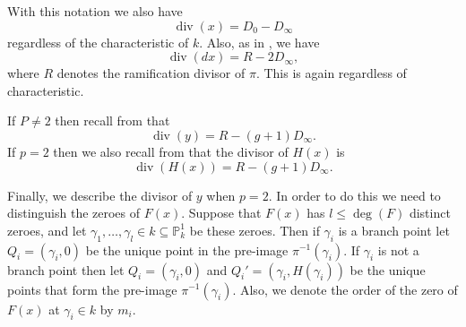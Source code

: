 \documentclass[draft, 11pt]{article} %
\theoremstyle{plain}
\theoremstyle{remark}
\DeclareMathOperator{\di}{div}
\begin{document}
With this notation we also have
\begin{equation}\label{divxp=2}
\di (x)  = D_0 - D_\infty
\end{equation}
regardless of the characteristic of $k$.
Also, as in \cite[\S 6]{faithfulaction}, we have
\begin{equation}\label{differentialdivisor}
\di(dx) = R - 2D_\infty,
\end{equation}
where $R$ denotes the ramification divisor of $\pi$.
This is again regardless of characteristic.

If $P \neq 2$ then recall from \cite[\S 6]{faithfulaction} that
\begin{equation}\label{pnot2divisors}
\di(y)  = R - (g+1)D_\infty.
\end{equation}
If $p=2$ then we also recall from \cite[\S 6]{faithfulaction} that the divisor of $H(x)$ is
\begin{equation}\label{divisorofH}
\di (H(x))  = R - (g+1)D_\infty. 
\end{equation}

Finally, we describe the divisor of $y$ when $p=2$.
In order to do this we need to distinguish the zeroes of $F(x)$.
Suppose that $F(x)$ has $l \leq \deg(F)$ distinct zeroes, and let $\gamma_1, \ldots, \gamma_l \in k \subseteq \mathbb P_k^1$ be these zeroes.
Then if $\gamma_i$ is a branch point let $Q_i = (\gamma_i, 0)$ be the unique point in the pre-image $\pi^{-1}(\gamma_i)$.
If $\gamma_i$ is not a branch point then let $Q_i = (\gamma_i, 0)$ and $Q_i' = (\gamma_i, H(\gamma_i))$ be the unique points that form the pre-image $\pi^{-1}(\gamma_i)$.
Also, we denote the order of the zero of $F(x)$ at $\gamma_i \in k$ by $m_i$.
\end{document}
